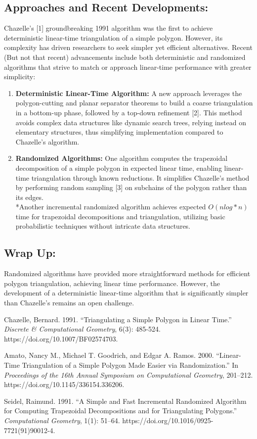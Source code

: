 \documentclass{article}
\begin{document}
\subsection*{Approaches and Recent Developments:}
Chazelle's [1] groundbreaking 1991 algorithm was the first to achieve deterministic linear-time triangulation of a simple polygon. However, its complexity has driven researchers to seek simpler yet efficient alternatives. Recent (But not that recent) advancements include both deterministic and randomized algorithms that strive to match or approach linear-time performance with greater simplicity:
\begin{enumerate}
    \item \textbf{Deterministic Linear-Time Algorithm: }
    A new approach leverages the polygon-cutting and planar separator theorems to build a coarse triangulation in a bottom-up phase, followed by a top-down refinement [2]. This method avoids complex data structures like dynamic search trees, relying instead on elementary structures, thus simplifying implementation compared to Chazelle's algorithm.
    \item \textbf{Randomized Algorithms: }
    One algorithm computes the trapezoidal decomposition of a simple polygon in expected linear time, enabling linear-time triangulation through known reductions. It simplifies Chazelle's method by performing random sampling  [3] on subchains of the polygon rather than its edges.
    \\
    *Another incremental randomized algorithm achieves expected $O(nlog*n)$ time for trapezoidal decompositions and triangulation, utilizing basic probabilistic techniques without intricate data structures.
\end{enumerate}

\subsection*{Wrap Up:}
Randomized algorithms have provided more straightforward methods for efficient polygon triangulation, achieving linear time performance. However, the development of a deterministic linear-time algorithm that is significantly simpler than Chazelle's remains an open challenge.


\begin{thebibliography}{3}
    Chazelle, Bernard. 1991. “Triangulating a Simple Polygon in Linear Time.” \textit{Discrete \& Computational Geometry}, 6(3): 485-524. https://doi.org/10.1007/BF02574703.

    Amato, Nancy M., Michael T. Goodrich, and Edgar A. Ramos. 2000. “Linear-Time Triangulation of a Simple Polygon Made Easier via Randomization.” In \textit{Proceedings of the 16th Annual Symposium on Computational Geometry}, 201–212. https://doi.org/10.1145/336154.336206.

    Seidel, Raimund. 1991. “A Simple and Fast Incremental Randomized Algorithm for Computing Trapezoidal Decompositions and for Triangulating Polygons.” \textit{Computational Geometry}, 1(1): 51–64. https://doi.org/10.1016/0925-7721(91)90012-4.
\end{thebibliography}
\end{document}
